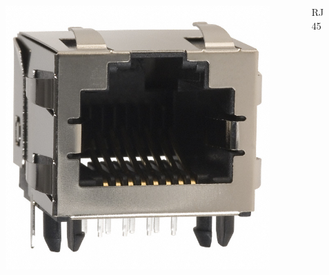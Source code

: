 \documentclass[
    ngerman,
    accentcolor=3b,
    fontsize= 12pt,
    a4paper,
    aspectratio=169,
    colorback=true,
    fancy_row_colors,
    leqno,
    fleqn,
    boxarc=3pt,
    fleqn,
    main,
    design=2008,
]{algoslides}
\begin{document}
\begin{frame}
\begin{columns}[c]
\begin{column}{.5\textwidth}
\begin{figure}[ht!]
                    \vspace{1em}
                    \includegraphics[height=.3\textheight]{rj45-socket}
                    \label{fig:rj45-socket}
                \end{figure}
            \end{column}
            \pause
            \begin{column}{.5\textwidth}
                \large
                \centering
                RJ45
            \end{column}
        \end{columns}
    \end{frame}
\end{document}
